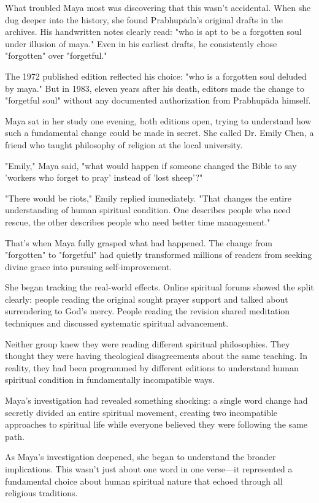\documentclass[11pt,twoside]{book}
\begin{document}
What troubled Maya most was discovering that this wasn't accidental. When she dug deeper into the history, she found Prabhupāda's original drafts in the archives. His handwritten notes clearly read: "who is apt to be a forgotten soul under illusion of maya." Even in his earliest drafts, he consistently chose "forgotten" over "forgetful."

The 1972 published edition reflected his choice: "who is a forgotten soul deluded by maya." But in 1983, eleven years after his death, editors made the change to "forgetful soul" without any documented authorization from Prabhupāda himself.

Maya sat in her study one evening, both editions open, trying to understand how such a fundamental change could be made in secret. She called Dr. Emily Chen, a friend who taught philosophy of religion at the local university.

"Emily," Maya said, "what would happen if someone changed the Bible to say 'workers who forget to pray' instead of 'lost sheep'?"

"There would be riots," Emily replied immediately. "That changes the entire understanding of human spiritual condition. One describes people who need rescue, the other describes people who need better time management."

That's when Maya fully grasped what had happened. The change from "forgotten" to "forgetful" had quietly transformed millions of readers from seeking divine grace into pursuing self-improvement.

She began tracking the real-world effects. Online spiritual forums showed the split clearly: people reading the original sought prayer support and talked about surrendering to God's mercy. People reading the revision shared meditation techniques and discussed systematic spiritual advancement.

Neither group knew they were reading different spiritual philosophies. They thought they were having theological disagreements about the same teaching. In reality, they had been programmed by different editions to understand human spiritual condition in fundamentally incompatible ways.

Maya's investigation had revealed something shocking: a single word change had secretly divided an entire spiritual movement, creating two incompatible approaches to spiritual life while everyone believed they were following the same path.

As Maya's investigation deepened, she began to understand the broader implications. This wasn't just about one word in one verse—it represented a fundamental choice about human spiritual nature that echoed through all religious traditions.
\end{document}
